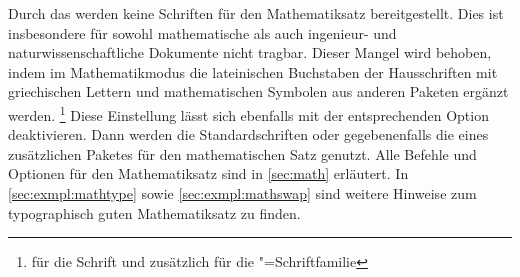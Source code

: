 Durch das \CD werden keine Schriften für den Mathematiksatz bereitgestellt. 
Dies ist insbesondere für sowohl mathematische als auch ingenieur- und 
naturwissenschaftliche Dokumente nicht tragbar. Dieser Mangel wird behoben, 
indem im Mathematikmodus die lateinischen Buchstaben der Hausschriften mit 
griechischen Lettern und mathematischen Symbolen aus anderen Paketen ergänzt 
werden.%
\footnote{%
   für die Schrift \DIN und zusätzlich  für 
  die \Univers"=Schriftfamilie%
}
Diese Einstellung lässt sich ebenfalls mit der entsprechenden Option 
deaktivieren. Dann werden die Standardschriften oder gegebenenfalls die eines 
zusätzlichen Paketes für den mathematischen Satz genutzt. Alle Befehle und 
Optionen für den Mathematiksatz sind in \autoref{sec:math} erläutert. In 
\autoref{sec:exmpl:mathtype} sowie \autoref{sec:exmpl:mathswap} sind weitere
Hinweise zum typographisch guten Mathematiksatz zu finden.


